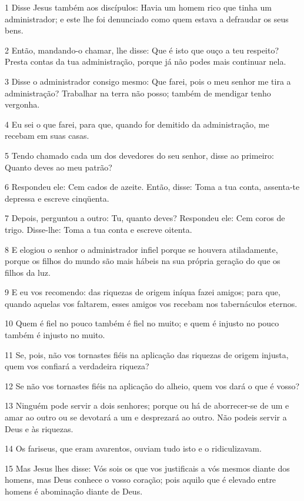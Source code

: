 \par 1 Disse Jesus também aos discípulos: Havia um homem rico que tinha um administrador; e este lhe foi denunciado como quem estava a defraudar os seus bens.
\par 2 Então, mandando-o chamar, lhe disse: Que é isto que ouço a teu respeito? Presta contas da tua administração, porque já não podes mais continuar nela.
\par 3 Disse o administrador consigo mesmo: Que farei, pois o meu senhor me tira a administração? Trabalhar na terra não posso; também de mendigar tenho vergonha.
\par 4 Eu sei o que farei, para que, quando for demitido da administração, me recebam em suas casas.
\par 5 Tendo chamado cada um dos devedores do seu senhor, disse ao primeiro: Quanto deves ao meu patrão?
\par 6 Respondeu ele: Cem cados de azeite. Então, disse: Toma a tua conta, assenta-te depressa e escreve cinqüenta.
\par 7 Depois, perguntou a outro: Tu, quanto deves? Respondeu ele: Cem coros de trigo. Disse-lhe: Toma a tua conta e escreve oitenta.
\par 8 E elogiou o senhor o administrador infiel porque se houvera atiladamente, porque os filhos do mundo são mais hábeis na sua própria geração do que os filhos da luz.
\par 9 E eu vos recomendo: das riquezas de origem iníqua fazei amigos; para que, quando aquelas vos faltarem, esses amigos vos recebam nos tabernáculos eternos.
\par 10 Quem é fiel no pouco também é fiel no muito; e quem é injusto no pouco também é injusto no muito.
\par 11 Se, pois, não vos tornastes fiéis na aplicação das riquezas de origem injusta, quem vos confiará a verdadeira riqueza?
\par 12 Se não vos tornastes fiéis na aplicação do alheio, quem vos dará o que é vosso?
\par 13 Ninguém pode servir a dois senhores; porque ou há de aborrecer-se de um e amar ao outro ou se devotará a um e desprezará ao outro. Não podeis servir a Deus e às riquezas.
\par 14 Os fariseus, que eram avarentos, ouviam tudo isto e o ridiculizavam.
\par 15 Mas Jesus lhes disse: Vós sois os que vos justificais a vós mesmos diante dos homens, mas Deus conhece o vosso coração; pois aquilo que é elevado entre homens é abominação diante de Deus.
